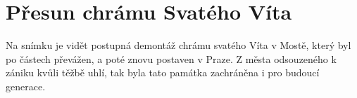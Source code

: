 
\chapter{Přesun chrámu Svatého Víta}

Na snímku je vidět postupná demontáž chrámu svatého Víta v Mostě, který byl po
částech převážen, a poté znovu postaven v Praze. Z města odsouzeného k zániku
kvůli těžbě uhlí, tak byla tato památka zachráněna i pro budoucí generace.


